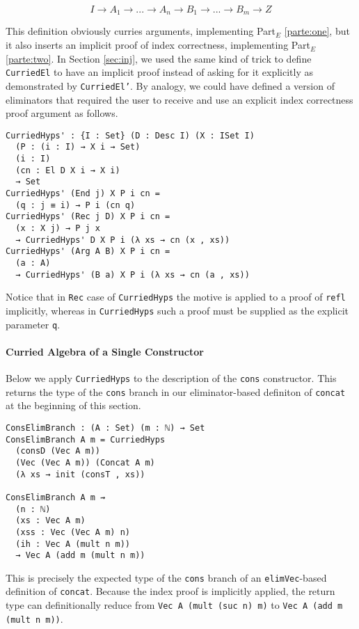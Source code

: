 \documentclass[preprint,nonatbib]{sigplanconf}
\newcommand{\refsec}[1]{Section \ref{sec:#1}}
\newcommand{\refparte}[1]{Part$_E$ \ref{parte:#1}}
\begin{document}
\[
I → A_1 → ... → A_n → B_1 → ... → B_m → Z
\]

This definition obviously curries arguments, implementing
\refparte{one}, but it also inserts an implicit proof of index
correctness, implementing \refparte{two}. In \refsec{inj}, we used
the same kind of trick to define {\tt CurriedEl} to have an implicit
proof instead of asking for it explicitly as demonstrated
by {\tt CurriedEl'}. By analogy, we could have defined a version of
eliminators that required the user to receive and use an explicit
index correctness proof argument as follows.

\begin{verbatim}
CurriedHyps' : {I : Set} (D : Desc I) (X : ISet I)
  (P : (i : I) → X i → Set)
  (i : I)
  (cn : El D X i → X i)
  → Set
CurriedHyps' (End j) X P i cn =
  (q : j ≡ i) → P i (cn q)
CurriedHyps' (Rec j D) X P i cn =
  (x : X j) → P j x
  → CurriedHyps' D X P i (λ xs → cn (x , xs))
CurriedHyps' (Arg A B) X P i cn =
  (a : A)
  → CurriedHyps' (B a) X P i (λ xs → cn (a , xs))
\end{verbatim}

Notice that in
{\tt Rec} case of {\tt CurriedHyps} the motive is applied to a proof
of {\tt refl} implicitly, whereas in {\tt CurriedHyps} such a proof
must be supplied as the explicit parameter {\tt q}.

\paragraph{Curried Algebra of a Single Constructor}

Below we apply {\tt CurriedHyps} to the description of the
{\tt cons} constructor. This returns the type of the {\tt cons} branch
in our eliminator-based definiton of {\tt concat} at the
beginning of this section.

\begin{verbatim}
ConsElimBranch : (A : Set) (m : ℕ) → Set
ConsElimBranch A m = CurriedHyps
  (consD (Vec A m))
  (Vec (Vec A m)) (Concat A m)
  (λ xs → init (consT , xs))

ConsElimBranch A m ⇝
  (n : ℕ)
  (xs : Vec A m)
  (xss : Vec (Vec A m) n)
  (ih : Vec A (mult n m))
  → Vec A (add m (mult n m))
\end{verbatim}

This is precisely the expected type of the {\tt cons} branch of
an {\tt elimVec}-based definition of {\tt concat}. Because the index
proof is implicitly applied, the return type can definitionally
reduce from {\tt Vec A (mult (suc n) m)}
to {\tt Vec A (add m (mult n m))}.
\end{document}
